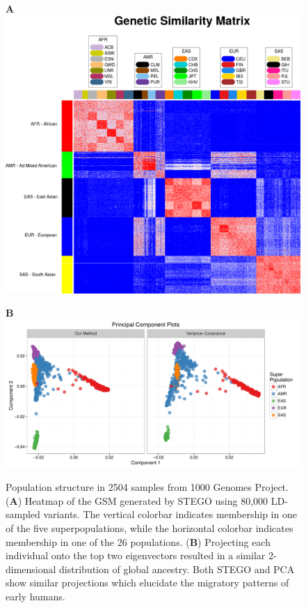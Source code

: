 \begin{figure}
\textbf{A}\includegraphics[width=0.75\columnwidth]{figures/GSM_trim}

\textbf{B}\includegraphics[width=0.8\columnwidth]{figures/PCA_all}\caption[Population structure within populations of 1000 Genomes Project.]{Population structure in 2504 samples from 1000 Genomes Project. (\textbf{A})
Heatmap of the GSM generated by STEGO using 80,000 LD-sampled variants.
The vertical colorbar indicates membership in one of the five superpopulations,
while the horizontal colorbar indicates membership in one of the 26
populations. (\textbf{B}) Projecting each individual onto the top
two eigenvectors resulted in a similar 2-dimensional distribution
of global ancestry. Both STEGO and PCA show similar projections which
elucidate the migratory patterns of early humans.}
\label{fig: heatmaps}
\end{figure}
